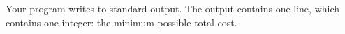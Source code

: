 Your program writes to standard output.
The output contains one line, which contains one integer: the minimum possible total cost.